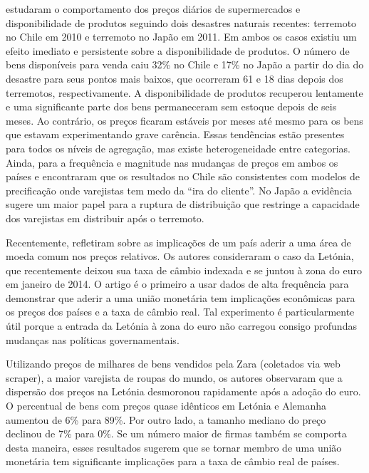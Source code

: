 \documentclass[twoside,a4paper,11pt]{report}
\begin{document}
\citet{cavallo2013prices}	estudaram o comportamento dos preços diários de supermercados e disponibilidade de produtos seguindo dois desastres naturais recentes: terremoto no Chile em 2010 e terremoto no Japão em 2011. Em ambos os casos existiu um efeito imediato e persistente sobre a disponibilidade de produtos. O número de bens disponíveis para venda caiu 32\% no Chile e 17\% no Japão a partir do dia do desastre para seus pontos mais baixos, que ocorreram 61 e 18 dias depois dos terremotos, respectivamente. A disponibilidade de produtos recuperou lentamente e uma significante parte dos bens permaneceram sem estoque depois de seis meses. Ao contrário, os preços ficaram estáveis por meses até mesmo para os bens que estavam experimentando grave carência. Essas tendências estão presentes para todos os níveis de agregação, mas existe heterogeneidade entre categorias. Ainda, \citet{cavallo2013prices} para a frequência e magnitude nas mudanças de preços em ambos os países e encontraram que os resultados no Chile são consistentes com modelos de precificação onde varejistas tem medo da “ira do cliente”. No Japão a evidência sugere um maior papel para a ruptura de distribuição que restringe a capacidade dos varejistas em distribuir após o terremoto. 

Recentemente, \citet{cavallo2014price} refletiram sobre as implicações de um país aderir a uma área de moeda comum nos preços relativos. Os autores consideraram o caso da Letónia, que recentemente deixou sua taxa de câmbio indexada e se juntou à zona do euro em janeiro de 2014. O artigo é o primeiro a usar dados de alta frequência para demonstrar que aderir a uma união monetária tem implicações econômicas para os preços dos países e a taxa de câmbio real. Tal experimento é particularmente útil porque a entrada da Letónia à zona do euro não carregou consigo profundas mudanças nas políticas governamentais. 

Utilizando preços de milhares de bens vendidos pela Zara (coletados via web scraper), a maior varejista de roupas do mundo, os autores observaram que a dispersão dos preços na Letónia desmoronou rapidamente após a adoção do euro. O percentual de bens com preços quase idênticos em Letónia e Alemanha aumentou de 6\% para 89\%. Por outro lado, a tamanho mediano do preço declinou de 7\% para 0\%. Se um número maior de firmas também se comporta desta maneira, esses resultados sugerem que se tornar membro de uma união monetária tem significante implicações para a taxa de câmbio real de países. 


\pagestyle{empty}
\cleardoublepage
\pagestyle{fancy}
\end{document}
